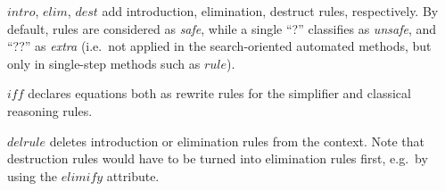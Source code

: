 \begin{descr}
\item [$intro$, $elim$, $dest$] add introduction, elimination, destruct rules,
  respectively.  By default, rules are considered as \emph{safe}, while a
  single ``?'' classifies as \emph{unsafe}, and ``??'' as \emph{extra} (i.e.\ 
  not applied in the search-oriented automated methods, but only in
  single-step methods such as $rule$).
  
\item [$iff$] declares equations both as rewrite rules for the simplifier and
  classical reasoning rules.

\item [$delrule$] deletes introduction or elimination rules from the context.
  Note that destruction rules would have to be turned into elimination rules
  first, e.g.\ by using the $elimify$ attribute.
\end{descr}


